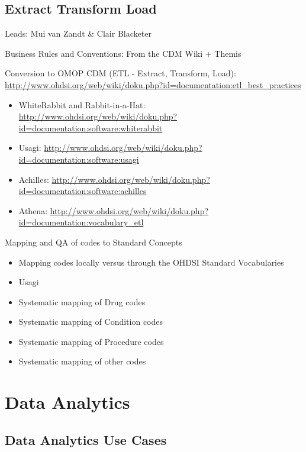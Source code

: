 \documentclass[]{book}
\providecommand{\tightlist}{%
  \setlength{\itemsep}{0pt}\setlength{\parskip}{0pt}}
\begin{document}
\chapter{Extract Transform Load}\label{ExtractTransformLoad}

Leads: Mui van Zandt \& Clair Blacketer

Business Rules and Conventions: From the CDM Wiki + Themis

Conversion to OMOP CDM (ETL - Extract, Transform, Load):
\url{http://www.ohdsi.org/web/wiki/doku.php?id=documentation:etl_best_practices}

\begin{itemize}
\tightlist
\item
  WhiteRabbit and Rabbit-in-a-Hat:
  \url{http://www.ohdsi.org/web/wiki/doku.php?id=documentation:software:whiterabbit}
\item
  Usagi:
  \url{http://www.ohdsi.org/web/wiki/doku.php?id=documentation:software:usagi}
\item
  Achilles:
  \url{http://www.ohdsi.org/web/wiki/doku.php?id=documentation:software:achilles}
\item
  Athena:
  \url{http://www.ohdsi.org/web/wiki/doku.php?id=documentation:vocabulary_etl}
\end{itemize}

Mapping and QA of codes to Standard Concepts

\begin{itemize}
\tightlist
\item
  Mapping codes locally versus through the OHDSI Standard Vocabularies
\item
  Usagi
\item
  Systematic mapping of Drug codes
\item
  Systematic mapping of Condition codes
\item
  Systematic mapping of Procedure codes
\item
  Systematic mapping of other codes
\end{itemize}

\part{Data Analytics}\label{part-data-analytics}

\chapter{Data Analytics Use Cases}\label{DataAnalyticsUseCases}
\end{document}
